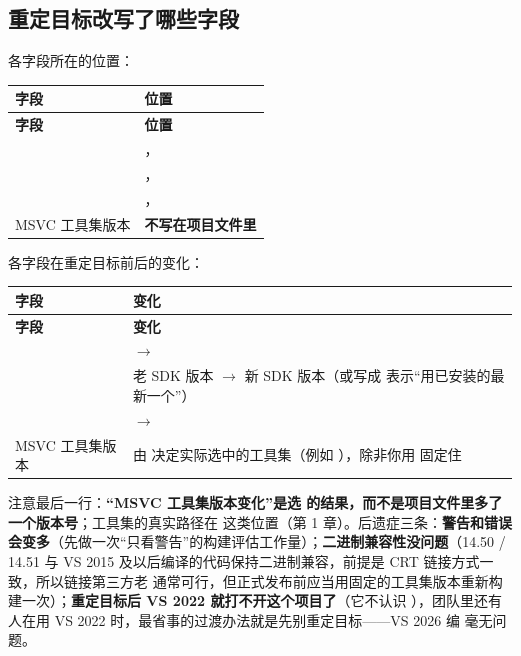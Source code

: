 {{\subsection{重定目标改写了哪些字段}

各字段所在的位置：

\begin{longtable}{L{7.6cm}L{7.0cm}}
\toprule
\textbf{字段} & \textbf{位置} \\
\midrule
\endfirsthead
\toprule
\textbf{字段} & \textbf{位置} \\
\midrule
\endhead
\bottomrule
\endlastfoot
{} & ， \\
 & ， \\
 & ， \\
MSVC 工具集版本 & \textbf{不写在项目文件里} \\
\end{longtable}

各字段在重定目标前后的变化：

\begin{longtable}{L{7.6cm}L{7.0cm}}
\toprule
\textbf{字段} & \textbf{变化} \\
\midrule
\endfirsthead
\toprule
\textbf{字段} & \textbf{变化} \\
\midrule
\endhead
\bottomrule
\endlastfoot
{} &  $\rightarrow$  \\
 & 老 SDK 版本 $\rightarrow$ 新 SDK 版本（或写成  表示“用已安装的最新一个”） \\
 &  $\rightarrow$  \\
MSVC 工具集版本 & 由  决定实际选中的工具集（例如 ），除非你用  固定住 \\
\end{longtable}

注意最后一行：\textbf{“MSVC 工具集版本变化”是选  的结果，而不是项目文件里多了一个版本号}；工具集的真实路径在  这类位置（第 1 章）。后遗症三条：\textbf{警告和错误会变多}（先做一次“只看警告”的构建评估工作量）；\textbf{二进制兼容性没问题}（14.50 / 14.51 与 VS 2015 及以后编译的代码保持二进制兼容，前提是 CRT 链接方式一致，所以链接第三方老  通常可行，但正式发布前应当用固定的工具集版本重新构建一次）；\textbf{重定目标后 VS 2022 就打不开这个项目了}（它不认识 ），团队里还有人在用 VS 2022 时，最省事的过渡办法就是先别重定目标——VS 2026 编  毫无问题。

}}
